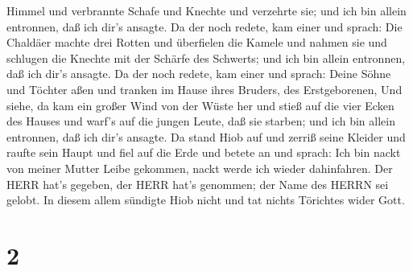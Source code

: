 Himmel und verbrannte Schafe und Knechte und verzehrte sie; und ich bin
allein entronnen, daß ich dir's ansagte.  Da der noch
redete, kam einer und sprach: Die Chaldäer machte drei Rotten und
überfielen die Kamele und nahmen sie und schlugen die Knechte mit der
Schärfe des Schwerts; und ich bin allein entronnen, daß ich dir's
ansagte.  Da der noch redete, kam einer und sprach: Deine
Söhne und Töchter aßen und tranken im Hause ihres Bruders, des
Erstgeborenen,  Und siehe, da kam ein großer Wind von der
Wüste her und stieß auf die vier Ecken des Hauses und warf's auf die
jungen Leute, daß sie starben; und ich bin allein entronnen, daß ich
dir's ansagte.  Da stand Hiob auf und zerriß seine Kleider
und raufte sein Haupt und fiel auf die Erde und betete an 
und sprach: Ich bin nackt von meiner Mutter Leibe gekommen, nackt werde
ich wieder dahinfahren. Der HERR hat's gegeben, der HERR hat's genommen;
der Name des HERRN sei gelobt.  In diesem allem sündigte
Hiob nicht und tat nichts Törichtes wider Gott.

\hypertarget{section-1}{%
\section{2}\label{section-1}}

